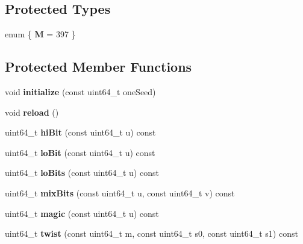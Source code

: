 \subsection*{Protected Types}
\begin{DoxyCompactItemize}
\item 
enum \{ {\bfseries M} = 397
 \}
\end{DoxyCompactItemize}
\subsection*{Protected Member Functions}
\begin{DoxyCompactItemize}
\item 
\hypertarget{classMTRand_a0098d14773e1be9c50224cfbc5eb0df9}{void {\bfseries initialize} (const uint64\-\_\-t one\-Seed)}\label{classMTRand_a0098d14773e1be9c50224cfbc5eb0df9}

\item 
\hypertarget{classMTRand_a1d5fcb69d83f4d2fd653883c8352f86c}{void {\bfseries reload} ()}\label{classMTRand_a1d5fcb69d83f4d2fd653883c8352f86c}

\item 
\hypertarget{classMTRand_ad4a7632a7738a3b7fcf8dc3a082f4bca}{uint64\-\_\-t {\bfseries hi\-Bit} (const uint64\-\_\-t u) const }\label{classMTRand_ad4a7632a7738a3b7fcf8dc3a082f4bca}

\item 
\hypertarget{classMTRand_a1cd2fc67f5bbcd20138d34772e2e5816}{uint64\-\_\-t {\bfseries lo\-Bit} (const uint64\-\_\-t u) const }\label{classMTRand_a1cd2fc67f5bbcd20138d34772e2e5816}

\item 
\hypertarget{classMTRand_ad69ec4672916b2fb55f6b10d71d15515}{uint64\-\_\-t {\bfseries lo\-Bits} (const uint64\-\_\-t u) const }\label{classMTRand_ad69ec4672916b2fb55f6b10d71d15515}

\item 
\hypertarget{classMTRand_a27a04b4c5852664be5da01569678725c}{uint64\-\_\-t {\bfseries mix\-Bits} (const uint64\-\_\-t u, const uint64\-\_\-t v) const }\label{classMTRand_a27a04b4c5852664be5da01569678725c}

\item 
\hypertarget{classMTRand_a718b184ca793fa2dfde467c7c9c70892}{uint64\-\_\-t {\bfseries magic} (const uint64\-\_\-t u) const }\label{classMTRand_a718b184ca793fa2dfde467c7c9c70892}

\item 
\hypertarget{classMTRand_a6d191303b615284e333378edfea1d1d7}{uint64\-\_\-t {\bfseries twist} (const uint64\-\_\-t m, const uint64\-\_\-t s0, const uint64\-\_\-t s1) const }\label{classMTRand_a6d191303b615284e333378edfea1d1d7}

\end{DoxyCompactItemize}
